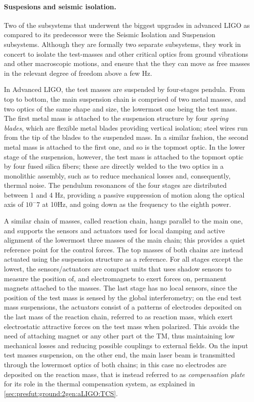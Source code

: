 \paragraph*{Suspesions and seismic isolation.}
Two of the subsystems that underwent the biggest upgrades in advanced LIGO as compared to its predecessor were the Seismic Isolation and Suspension subsystems. Although they are formally two separate subsystems, they work in concert to isolate the test-masses and other critical optics from ground vibrations and other macroscopic motions, and ensure that the they can move as free masses in the relevant degree of freedom above a few Hz.

In Advanced LIGO, the test masses are suspended by four-stages pendula. From top to bottom, the main suspension chain is comprised of two metal masses, and two optics of the same shape and size, the lowermost one being the test mass. The first metal mass is attached to the suspension structure by four \textit{spring blades}, which are flexible metal blades providing vertical isolation; steel wires run from the tip of the blades to the suspended mass. In a similar fashion, the second metal mass is attached to the first one, and so is the topmost optic. In the lower stage of the suspension, however, the test mass is attached to the topmost optic by four fused silica fibers; these are directly welded to the two optics in a monolithic assembly, such as to reduce mechanical losses and, consequently, thermal noise. The pendulum resonances of the four stages are distributed between 1 and 4 Hz, providing a passive suppression of motion along the optical axis of $10^-7$ at 10\.Hz, and going down as the frequency to the eighth power.

A similar chain of masses, called reaction chain, hangs parallel to the main one, and supports the sensors and actuators used for local damping and active alignment of the lowermost three masses of the main chain; this provides a quiet reference point for the control forces. The top masses of both chains are instead actuated using the suspension structure as a reference. For all stages except the lowest, the sensors/actuators are compact units that uses shadow sensors to measure the position of, and electromagnets to exert forces on, permanent magnets attached to the masses. The last stage has no local sensors, since the position of the test mass is sensed by the global interferometry; on the end test mass suspensions, the actuators consist of a patterns of electrodes deposited on the last mass of the reaction chain, referred to as reaction mass, which exert electrostatic attractive forces on the test mass when polarized. This avoids the need of attaching magnet or any other part ot the TM, thus maintaining low mechanical losses and reducing possible couplings to external fields. On the input test masses suspension, on the other end, the main laser beam is transmitted through the lowermost optics of both chains; in this case no electrodes are deposited on the reaction mass, that is instead referred to as \textit{compensation plate} for its role in the thermal compensation system, as explained in \ref{sec:presfut:ground:2gen:aLIGO:TCS}.

